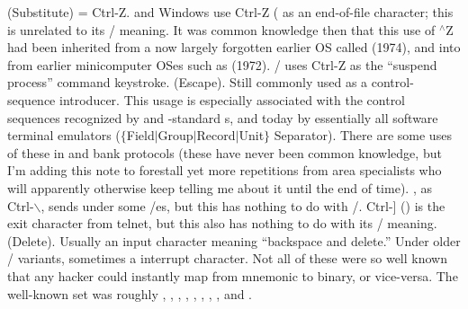 \dlist {} (Substitute) = Ctrl-Z.
 and Windows use Ctrl-Z ( as an end-of-file character; this is unrelated
to its \ASCII/ meaning. It was common knowledge then that this use of $^\wedge$Z
had been inherited from a now largely forgotten earlier OS called  (1974),
and into  from earlier  minicomputer OSes such as  (1972). \UNIX/
uses Ctrl-Z as the ``suspend process'' command keystroke.
\dlist {} (Escape).
Still commonly used as a control-sequence introducer. This usage is especially
associated with the control sequences recognized by  and -standard
s, and today by essentially all software terminal emulators
\dlist {} ($\lbrace$Field$\vert$Group$\vert$Record$\vert$Unit$\rbrace$ Separator).
There are some uses of these in  and bank protocols (these have never been
common knowledge, but I'm adding this note to forestall yet more repetitions
from area specialists who will apparently otherwise keep telling me about it
until the end of time). , as Ctrl-$\backslash$, sends  under some
\UNIX/es, but this has nothing to do with \ASCII/. Ctrl-] () is the exit
character from telnet, but this also has nothing to do with its \ASCII/ meaning.
\dlist {} (Delete).
Usually an input character meaning ``backspace and delete.'' Under older \UNIX/
variants, sometimes a  interrupt character.
\medbreak
\noindent Not all of these were so well known that any hacker could instantly
map from mnemonic to binary, or vice-versa. The well-known set was roughly ,
, , , , , , , and .

